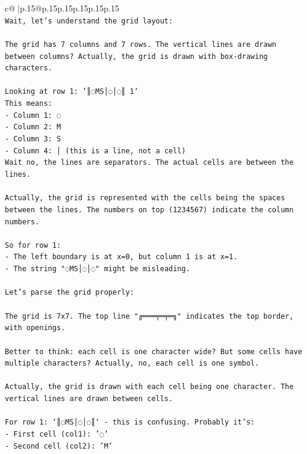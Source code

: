 \documentclass{article}
\begin{document}
{\begin{supertabular}{c@{$\;$}|p{.15\linewidth}@{}p{.15\linewidth}p{.15\linewidth}p{.15\linewidth}p{.15\linewidth}p{.15\linewidth}}
{{{\\ 
\texttt{Wait, let's understand the grid layout:} \\
\\ 
\texttt{The grid has 7 columns and 7 rows. The vertical lines are drawn between columns? Actually, the grid is drawn with box{-}drawing characters.} \\
\\ 
\texttt{Looking at row 1: `║◌MS│◌│◌║ 1`} \\
\texttt{This means:} \\
\texttt{{-} Column 1: ◌} \\
\texttt{{-} Column 2: M} \\
\texttt{{-} Column 3: S} \\
\texttt{{-} Column 4: │ (this is a line, not a cell)} \\
\texttt{Wait no, the lines are separators. The actual cells are between the lines.} \\
\\ 
\texttt{Actually, the grid is represented with the cells being the spaces between the lines. The numbers on top (1234567) indicate the column numbers.} \\
\\ 
\texttt{So for row 1:} \\
\texttt{{-} The left boundary is at x=0, but column 1 is at x=1.} \\
\texttt{{-} The string "◌MS│◌│◌" might be misleading.} \\
\\ 
\texttt{Let's parse the grid properly:} \\
\\ 
\texttt{The grid is 7x7. The top line "╔═══╤═╤═╗" indicates the top border, with openings.} \\
\\ 
\texttt{Better to think: each cell is one character wide? But some cells have multiple characters? Actually, no, each cell is one symbol.} \\
\\ 
\texttt{Actually, the grid is drawn with each cell being one character. The vertical lines are drawn between cells.} \\
\\ 
\texttt{For row 1: `║◌MS│◌│◌║` {-} this is confusing. Probably it's:} \\
\texttt{{-} First cell (col1): '◌'} \\
\texttt{{-} Second cell (col2): 'M'} \\
}}}
\end{supertabular}}
\end{document}
